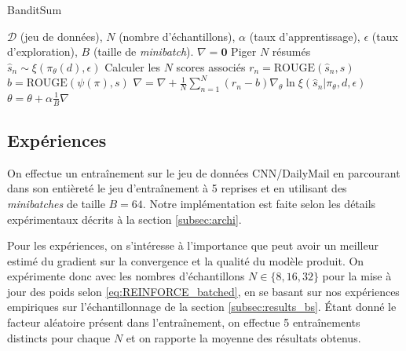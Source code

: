 \begin{algorithm}
    \caption{BanditSum}
    \begin{algorithmic}[1]
        \Require  $\mathcal{D}$ (jeu de données), $N$ (nombre d'échantillons), $\alpha$ (taux d'apprentissage), $\epsilon$ (taux d'exploration), $B$ (taille de \textit{minibatch}).
         
        \State $\nabla = \mathbf{0}$
        \State Piger $N$ résumés $\hat{s}_n \sim \xi(\pi_\theta(d), \epsilon)$
        \State Calculer les $N$ scores associés $r_n = \text{ROUGE}(\hat{s}_n, s)$
        \State $b = \text{ROUGE}(\psi(\pi), s)$
        \State $\nabla = \nabla + \frac{1}{N} \sum_{n=1}^N (r_n - b) \nabla_\theta \ln \xi \left(\hat{s}_n| \pi_\theta, d, \epsilon \right)$ \Comment{\eqref{eq:REINFORCE_batched}}
        \EndFor
        \State $\theta = \theta + \alpha \frac{1}{B}\nabla$
        \EndWhile
    \end{algorithmic}
    \label{alg:BanditSum}
\end{algorithm}

\subsection{Expériences}

On effectue un entraînement sur le jeu de données CNN/DailyMail en 
parcourant dans son entièreté le jeu d'entraînement à 5 reprises
et en utilisant des \textit{minibatches} de taille $B=64$.
Notre implémentation est faite selon les détails expérimentaux décrits à la section 
\ref{subsec:archi}.

Pour les expériences, on s'intéresse à
l'importance que peut avoir un meilleur estimé du gradient sur la convergence
et la qualité du modèle produit.
On expérimente donc avec les nombres d'échantillons $N \in \{8, 16, 32\}$
pour la mise à jour des poids selon \eqref{eq:REINFORCE_batched},
en se basant sur nos expériences empiriques sur l'échantillonnage
de la section \ref{subsec:results_bs}.
Étant donné le facteur aléatoire présent dans l'entraînement, on effectue 
5 entraînements distincts pour chaque $N$ et on rapporte la moyenne
des résultats obtenus. 

